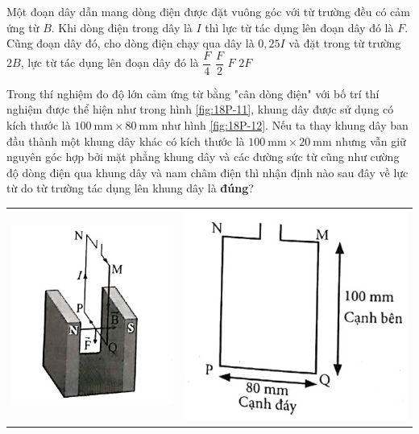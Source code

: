 \begin{ex}
	Một đoạn dây dẫn mang dòng điện được đặt vuông góc với từ trường đều có cảm ứng từ $B$. Khi dòng điện trong dây là $I$ thì lực từ tác dụng lên đoạn dây đó là $F$. Cũng đoạn dây đó, cho dòng điện chạy qua dây là $0,25I$ và đặt trong từ trường $2B$, lực từ tác dụng lên đoạn dây đó là
	\choice
	{$\dfrac{F}{4}$}
	{\True $\dfrac{F}{2}$}
	{$F$}
	{$2F$}
	\loigiai{}
\end{ex}
\begin{ex}
	Trong thí nghiệm đo độ lớn cảm ứng từ bằng "cân dòng điện" với bố trí thí nghiệm được thể hiện như trong hình \ref{fig:18P-11}, khung dây được sử dụng có kích thước là $\SI{100}{\milli\meter}\times\SI{80}{\milli\meter}$ như hình \ref{fig:18P-12}. Nếu ta thay khung dây ban đầu thành một khung dây khác có kích thước là $\SI{100}{\milli\meter}\times\SI{20}{\milli\meter}$ nhưng vẫn giữ nguyên góc hợp bởi mặt phẳng khung dây và các đường sức từ cũng như cường độ dòng điện qua khung dây và nam châm điện thì nhận định nào sau đây về lực từ do từ trường tác dụng lên khung dây là \textbf{đúng}?
	\begin{center}
		\begin{tabular}{M{8cm}M{8cm}}
			\includegraphics[width=0.6\linewidth]{figs/VN12-Y24-PH-SYL-018P-11}
			\label{fig:18P-11}
			&\includegraphics[width=0.6\linewidth]{figs/VN12-Y24-PH-SYL-018P-12}

\end{tabular}
\end{center}
\end{ex}

